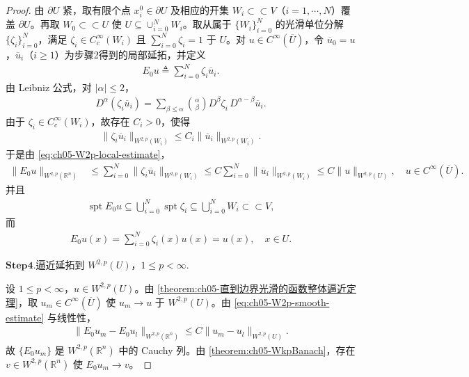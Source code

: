 \documentclass[../../main.tex]{subfiles}%
\begin{document}
\begin{proof}
由 $\partial U$ 紧，取有限个点 $x_i^0\in\partial U$ 及相应的开集 $W_i\subset\subset V$（$i=1,\cdots,N$）覆盖 $\partial U$。再取 $W_0\subset\subset U$ 使 $U\subseteq\cup_{i=0}^{N}W_i$。取从属于 $\{W_i\}_{i=0}^{N}$ 的光滑单位分解 $\{\zeta_i\}_{i=0}^{N}$，满足 $\zeta_i\in C_c^{\infty}(W_i)$ 且 $\sum_{i=0}^{N}\zeta_i=1$ 于 $U$。对 $u\in C^{\infty}(\overline U)$，令 $\overline u_0=u$，$\overline u_i$（$i\geqslant1$）为步骤2得到的局部延拓，并定义
\begin{align*}
E_0u\triangleq\sum_{i=0}^{N}\zeta_i\overline u_i.
\end{align*}
由 Leibniz 公式，对 $|\alpha|\leqslant2$，
\begin{align*}
D^{\alpha}(\zeta_i\overline u_i)
=\sum_{\beta\leqslant\alpha}\binom{\alpha}{\beta}D^{\beta}\zeta_i\,D^{\alpha-\beta}\overline u_i.
\end{align*}
由于 $\zeta_i\in C_c^{\infty}(W_i)$，故存在 $C_i>0$，使得
\begin{align*}
\|\zeta_i\overline u_i\|_{W^{2,p}(W_i)}
\leqslant C_i\|\overline u_i\|_{W^{2,p}(W_i)}.
\end{align*}
于是由 \eqref{eq:ch05-W2p-local-estimate}，
\begin{align}
\|E_0u\|_{W^{2,p}(\mathbb{R}^{n})}
&\leqslant\sum_{i=0}^{N}\|\zeta_i\overline u_i\|_{W^{2,p}(W_i)}
\leqslant C\sum_{i=0}^{N}\|\overline u_i\|_{W^{2,p}(W_i)}
\leqslant C\|u\|_{W^{2,p}(U)},\quad u\in C^{\infty}(\overline U).
\label{eq:ch05-W2p-smooth-estimate}
\end{align}
并且
\begin{align*}
\operatorname{spt}E_0u
\subseteq\bigcup_{i=0}^{N}\operatorname{spt}\zeta_i
\subseteq\bigcup_{i=0}^{N}W_i
\subset\subset V,
\end{align*}
而
\begin{align*}
E_0u(x)=\sum_{i=0}^{N}\zeta_i(x)u(x)=u(x),\quad x\in U.
\end{align*}

\noindent$\mathbf{Step}\bm{4}$.{\heiti 逼近延拓到 $W^{2,p}(U)$，$1\leqslant p<\infty$.}

设 $1\leqslant p<\infty$，$u\in W^{2,p}(U)$。由 \cref{theorem:ch05-直到边界光滑的函数整体逼近定理}，取 $u_m\in C^{\infty}(\overline U)$ 使 $u_m\to u$ 于 $W^{2,p}(U)$。由 \eqref{eq:ch05-W2p-smooth-estimate} 与线性性，
\begin{align*}
\|E_0u_m-E_0u_l\|_{W^{2,p}(\mathbb{R}^{n})}
\leqslant C\|u_m-u_l\|_{W^{2,p}(U)}.
\end{align*}
故 $\{E_0u_m\}$ 是 $W^{2,p}(\mathbb{R}^{n})$ 中的 Cauchy 列。由 \cref{theorem:ch05-WkpBanach}，存在 $v\in W^{2,p}(\mathbb{R}^{n})$ 使 $E_0u_m\to v$。


\end{proof}
\end{document}
